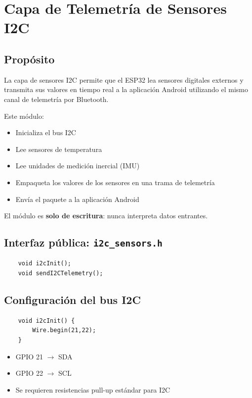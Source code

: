 \documentclass[12pt,a4paper]{article}
\newcommand{\ardfnDG}[1]{\texttt{\textcolor{arduinoTeal}{#1}}}
\begin{document}
\section{Capa de Telemetría de Sensores I2C}

\subsection{Propósito}

La capa de sensores I2C permite que el ESP32 lea sensores digitales externos y
transmita sus valores en tiempo real a la aplicación Android utilizando el mismo
canal de telemetría por Bluetooth.

Este módulo:
\begin{itemize}
	\item Inicializa el bus I2C
	\item Lee sensores de temperatura
	\item Lee unidades de medición inercial (IMU)
	\item Empaqueta los valores de los sensores en una trama de telemetría
	\item Envía el paquete a la aplicación Android
\end{itemize}

El módulo es \textbf{solo de escritura}: nunca interpreta datos entrantes.

\subsection{Interfaz pública: \ardfnDG{i2c\_sensors.h}}

\begin{lstlisting}
	void i2cInit();
	void sendI2CTelemetry();
\end{lstlisting}

\subsection{Configuración del bus I2C}

\begin{lstlisting}
	void i2cInit() {
		Wire.begin(21,22);
	}
\end{lstlisting}

\begin{itemize}
	\item GPIO 21 $\rightarrow$ SDA
	\item GPIO 22 $\rightarrow$ SCL
	\item Se requieren resistencias pull-up estándar para I2C
\end{itemize}
\end{document}

